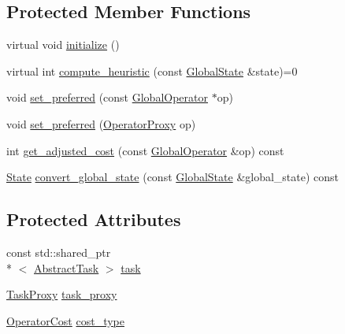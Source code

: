 \subsection*{Protected Member Functions}
\begin{DoxyCompactItemize}
\item 
virtual void \hyperlink{classHeuristic_a26e75bad1d806657c0ed274b4fe72f0a}{initialize} ()
\item 
virtual int \hyperlink{classHeuristic_a4fd4e087281805e0e76a814e06d4e506}{compute\-\_\-heuristic} (const \hyperlink{classGlobalState}{Global\-State} \&state)=0
\item 
void \hyperlink{classHeuristic_a1311c3ee01e571cab3d69d0c400d7489}{set\-\_\-preferred} (const \hyperlink{classGlobalOperator}{Global\-Operator} $\ast$op)
\item 
void \hyperlink{classHeuristic_a5edad9b47f651f5fb5f5ca0155598bf4}{set\-\_\-preferred} (\hyperlink{classOperatorProxy}{Operator\-Proxy} op)
\item 
int \hyperlink{classHeuristic_aa9c79f298fafa5a09232ba211fab427e}{get\-\_\-adjusted\-\_\-cost} (const \hyperlink{classGlobalOperator}{Global\-Operator} \&op) const 
\item 
\hyperlink{classState}{State} \hyperlink{classHeuristic_ac3193969815e60e8240d0ab11d95de74}{convert\-\_\-global\-\_\-state} (const \hyperlink{classGlobalState}{Global\-State} \&global\-\_\-state) const 
\end{DoxyCompactItemize}
\subsection*{Protected Attributes}
\begin{DoxyCompactItemize}
\item 
const std\-::shared\-\_\-ptr\\*
$<$ \hyperlink{classAbstractTask}{Abstract\-Task} $>$ \hyperlink{classHeuristic_a18d1566ceffd9eda72872097aa69b8ee}{task}
\item 
\hyperlink{classTaskProxy}{Task\-Proxy} \hyperlink{classHeuristic_a6d5e017aecf4112988ed9073d153af20}{task\-\_\-proxy}
\item 
\hyperlink{operator__cost_8h_aea97a5a2fbe3b57faf505007e38f5de9}{Operator\-Cost} \hyperlink{classHeuristic_a03d136586bf5c7c9f501d0ee3c2f477f}{cost\-\_\-type}
\end{DoxyCompactItemize}


